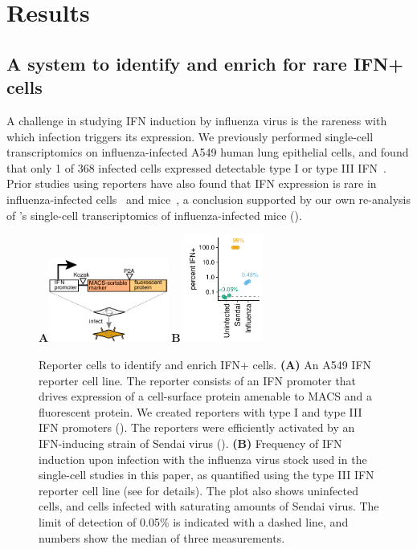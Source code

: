 \documentclass[9pt,lineno]{template}
\begin{document}
\section{Results}

\subsection{A system to identify and enrich for rare IFN+ cells}
A challenge in studying IFN induction by influenza virus is the rareness with which infection triggers its expression.
We previously performed single-cell transcriptomics on influenza-infected A549 human lung epithelial cells, and found that only 1 of 368 infected cells expressed detectable type I or type III IFN~\citep{russell2018extreme}.
Prior studies using reporters have also found that IFN expression is rare in influenza-infected cells~\citep{killip2017single} and mice~\citep{kallfass2013visualizing}, a conclusion supported by our own re-analysis of \citet{steuerman2018dissection}'s single-cell transcriptomics of influenza-infected mice ().

\begin{figure}
\centerline{
{\bf \Large A}\includegraphics[width=0.35\textwidth,valign=t]{figures/IFN_stochastic/IFN_reporter/IFN_reporter.pdf}
\hspace{0.02\textwidth}
{\bf \Large B} \includegraphics[width=0.23\textwidth,valign=t]{figures/IFN_stochastic/Flow/ifn_percent.pdf}
}
\caption{
Reporter cells to identify and enrich IFN+ cells.
{\bf (A)} An A549 IFN reporter cell line.
The reporter consists of an IFN promoter that drives expression of a cell-surface protein amenable to MACS and a fluorescent protein.
We created reporters with type I and type III IFN promoters ().
The reporters were efficiently activated by an IFN-inducing strain of Sendai virus ().
{\bf (B)}
Frequency of IFN induction upon infection with the influenza virus stock used in the single-cell studies in this paper, as quantified using the type III IFN reporter cell line (see  for details).
The plot also shows uninfected cells, and cells infected with saturating amounts of Sendai virus.
The limit of detection of 0.05\% is indicated with a dashed line, and numbers show the median of three measurements.
}
\label{fig:IFNrare}
\end{figure}
\end{document}
